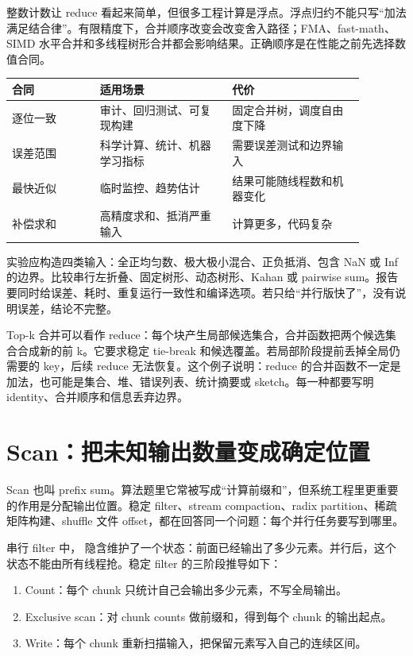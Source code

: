 整数计数让 reduce 看起来简单，但很多工程计算是浮点。浮点归约不能只写“加法满足结合律”。有限精度下，合并顺序改变会改变舍入路径；FMA、fast-math、SIMD 水平合并和多线程树形合并都会影响结果。正确顺序是在性能之前先选择数值合同。

\begin{center}
\begin{tabular}{p{0.22\linewidth}p{0.33\linewidth}p{0.33\linewidth}}
\toprule
合同 & 适用场景 & 代价 \\
\midrule
逐位一致 & 审计、回归测试、可复现构建 & 固定合并树，调度自由度下降 \\
误差范围 & 科学计算、统计、机器学习指标 & 需要误差测试和边界输入 \\
最快近似 & 临时监控、趋势估计 & 结果可能随线程数和机器变化 \\
补偿求和 & 高精度求和、抵消严重输入 & 计算更多，代码复杂 \\
\bottomrule
\end{tabular}
\end{center}

实验应构造四类输入：全正均匀数、极大极小混合、正负抵消、包含 NaN 或 Inf 的边界。比较串行左折叠、固定树形、动态树形、Kahan 或 pairwise sum。报告要同时给误差、耗时、重复运行一致性和编译选项。若只给“并行版快了”，没有说明误差，结论不完整。

Top-k 合并可以看作 reduce：每个块产生局部候选集合，合并函数把两个候选集合合成新的前 k。它要求稳定 tie-break 和候选覆盖。若局部阶段提前丢掉全局仍需要的 key，后续 reduce 无法恢复。这个例子说明：reduce 的合并函数不一定是加法，也可能是集合、堆、错误列表、统计摘要或 sketch。每一种都要写明 identity、合并顺序和信息丢弃边界。

\section{Scan：把未知输出数量变成确定位置}

Scan 也叫 prefix sum。算法题里它常被写成“计算前缀和”，但系统工程里更重要的作用是分配输出位置。稳定 filter、stream compaction、radix partition、稀疏矩阵构建、shuffle 文件 offset，都在回答同一个问题：每个并行任务要写到哪里。

串行 filter 中， 隐含维护了一个状态：前面已经输出了多少元素。并行后，这个状态不能由所有线程抢。稳定 filter 的三阶段推导如下：

\begin{enumerate}
  \item Count：每个 chunk 只统计自己会输出多少元素，不写全局输出。
  \item Exclusive scan：对 chunk counts 做前缀和，得到每个 chunk 的输出起点。
  \item Write：每个 chunk 重新扫描输入，把保留元素写入自己的连续区间。
\end{enumerate}

